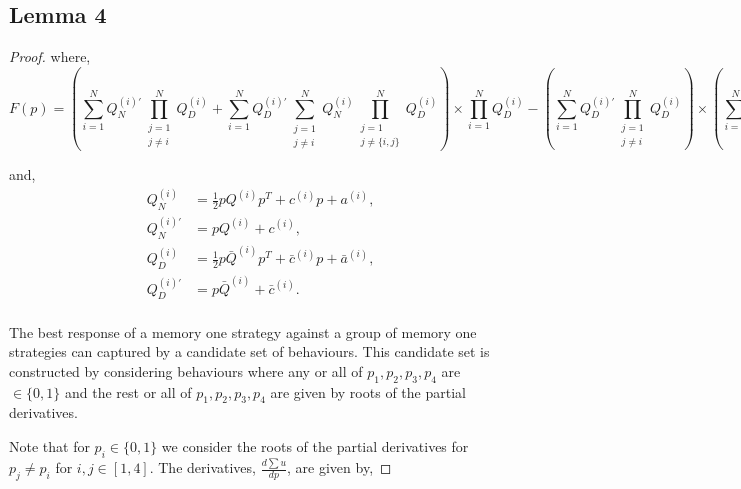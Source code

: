 \subsection{Lemma 4}

\begin{proof}

    where,
    \begin{equation}\label{eq:group_derivative_numerator_condition}
    F(p)=(\sum\limits_{i=1} ^ {N} Q_{N}^{(i)'} \prod_{\substack{j=1 \\ j \neq i}} ^ N Q_{D}^{(i)}
     + \sum\limits_{i=1} ^ {N} Q_{D}^{(i)'} \sum_{\substack{j=1 \\ j \neq i}} ^ {N} Q_{N}^{(i)}
    \prod_{\substack{j=1 \\ j \neq \{i, j\}}} ^ N Q_{D}^{(i)}) \times
    \prod\limits_{i=1} ^ N Q_{D}^{(i)} - (\sum\limits_{i=1} ^ {N} Q_{D}^{(i)'}
    \prod_{\substack{j=1 \\ j \neq i}} ^ N Q_{D}^{(i)}) \times
    (\sum\limits_{i=1} ^ {N} Q_{N}^{(i)} \prod_{\substack{j=1 \\ j \neq i}} ^ N Q_{D}^{(i)})
    \end{equation}

    and,
    \begin{align*}
        Q_{N}^{(i) } & = \frac{1}{2} pQ^{(i)} p^T + c^{(i)} p + a^ {(i)}, \\
        Q_{N}^{(i)'} & =  pQ^{(i)} + c^{(i)}, \\
        Q_{D}^{(i) } & = \frac{1}{2} p\bar{Q}^{(i)} p^T + \bar{c}^{(i)} p + \bar{a}^ {(i)}, \\
        Q_{D}^{(i)'} & =  p\bar{Q}^{(i)} + \bar{c}^{(i)}. \\
    \end{align*}


    The best response of a memory one strategy against a group of memory one
    strategies can captured by a candidate set of behaviours. This candidate set
    is constructed by considering behaviours where any or all of \(p_1, p_2,
    p_3, p_4\) are \(\in \{0, 1\}\) and the rest or all of \(p_1, p_2, p_3,
    p_4\) are given by roots of the partial derivatives.
    
    Note that for \(p_i \in
    \{0, 1\}\) we consider the roots of the partial derivatives for \(p_j \neq
    p_i\) for \(i,j \in [1, 4]\). The derivatives, \(\frac{d\sum u}{dp}\), are
    given by,


\end{proof}
